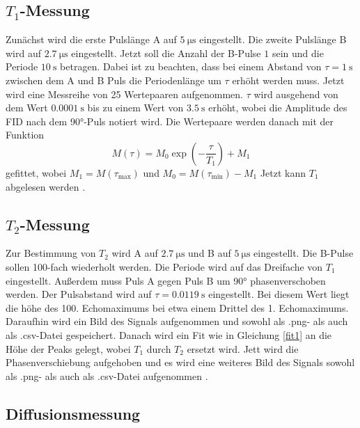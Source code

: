 \subsection{\texorpdfstring{$T_1$}{T1}-Messung}
\label{sec:T1Messung}

Zunächst wird die erste Pulslänge A auf $\SI{5}{\micro\second}$ eingestellt.
Die zweite Pulslänge B wird auf $\SI{2.7}{\micro\second}$ eingestellt.
Jetzt soll die Anzahl der B-Pulse $1$ sein und die Periode $\SI{10}{\second}$
betragen. Dabei ist zu beachten, dass bei einem Abstand von $\tau = \SI{1}{\second}$
zwischen dem A und B Puls die Periodenlänge um $\tau$ erhöht werden muss.
Jetzt wird eine Messreihe von 25 Wertepaaren aufgenommen. 
$\tau$ wird ausgehend von dem Wert $\SI{0.0001}{\second}$ bis zu einem Wert von 
$\SI{3.5}{\second}$ erhöht, wobei die Amplitude des FID nach dem 90°-Puls
notiert wird.
Die Wertepaare werden danach mit der Funktion 
\begin{equation}
    M(\tau) = M_{\text{0}} \exp{\left(-\frac{\tau}{T_{\text{1}}} \right)} + M_{\text{1}}
    \label{fit1}
\end{equation}
gefittet, wobei $M_{\text{1}} = M(\tau_{\text{max}})$ und
$M_{\text{0}} = M(\tau_{\text{min}}) - M_{\text{1}}$
Jetzt kann $T_{\text{1}}$ abgelesen werden
\cite{anleitung}. 

\subsection{\texorpdfstring{$T_2$}{T2}-Messung}
\label{sec:T2Messung}

Zur Bestimmung von $T_{\text{2}}$ wird A auf $\SI{2.7}{\micro\second}$ und B auf
$\SI{5}{\micro\second}$ eingestellt. Die B-Pulse sollen 100-fach wiederholt werden.
Die Periode wird auf das Dreifache von $T_{\text{1}}$ eingestellt.
Außerdem muss Puls A gegen Puls B um 90° phasenverschoben werden. Der Pulsabstand wird 
auf $\tau = \SI{0.0119}{\second}$ eingestellt. Bei diesem Wert liegt die höhe 
des 100. Echomaximums bei etwa einem Drittel des 1. Echomaximums.
Daraufhin wird ein Bild des Signals aufgenommen und sowohl als .png- als auch als 
.csv-Datei gespeichert. Danach wird ein Fit wie in Gleichung \ref{fit1} 
an die Höhe der Peaks gelegt,
wobei $T_{\text{1}}$ durch $T_{\text{2}}$ ersetzt wird.
Jett wird die Phasenverschiebung aufgehoben und es wird eine weiteres Bild des 
Signals sowohl als .png- als auch als .csv-Datei aufgenommen \cite{anleitung}.

\subsection{Diffusionsmessung}
\label{Diffusionsmessung}


